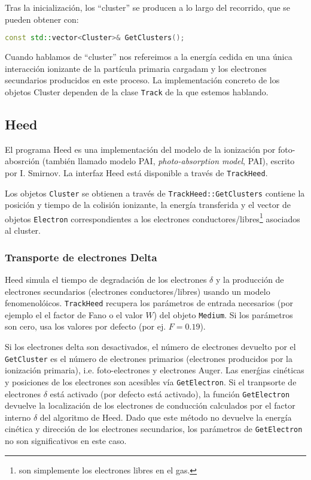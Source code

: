 Tras la inicialización, los ``cluster'' se producen a lo largo del recorrido, que se pueden obtener con: \\

\begin{lstlisting}[language=C++,style=c++]
const std::vector<Cluster>& GetClusters();
\end{lstlisting}
\vspace*{0.7em}
Cuando hablamos de ``cluster'' nos refereimos a la energía cedida en una única interacción ionizante de la partícula primaria cargadam y los electrones  secundarios producidos en este proceso. La implementación concreto de los objetos Cluster dependen de la clase \texttt{Track} de la que estemos hablando. 

\subsection{Heed}

El programa Heed es una implementación del modelo de la ionización por foto-abosrción (también llamado modelo PAI, \textit{photo-absorption model}, PAI), escrito por I. Smirnov. La interfaz Heed está disponible a través de \texttt{TrackHeed}.

Los objetos \texttt{Cluster} se obtienen a través de \texttt{TrackHeed::GetClusters} contiene la posición y tiempo de la colisión ionizante, la energía transferida y el vector de objetos \texttt{Electron} correspondientes a los electrones conductores/libres\footnote{son simplemente los electrones libres en el gas.} asociados al cluster. 

\subsubsection{Transporte de electrones Delta}

Heed simula el tiempo de degradación de los electrones $\delta$ y la producción de electrones secundarios (electrones conductores/libres) usando un modelo fenomenolóicos. \texttt{TrackHeed} recupera los parámetros de entrada necesarios (por ejemplo el el factor de Fano o el valor $W$) del objeto \texttt{Medium}. Si los parámetros son cero, usa los valores por defecto (por ej. $F=0.19$).


Si los electrones delta son desactivados, el número de electrones devuelto por el \texttt{GetCluster} es el número de electrones primarios (electrones producidos por la ionización primaria), i.e. foto-electrones y electrones Auger. Las enerǵias cinéticas y posiciones de los electrones son acesibles vía \texttt{GetElectron}. Si el tranpsorte de electrones $\delta$ está activado (por defecto está activado), la función \texttt{GetElectron} devuelve la localización de los electrones de conducción calculados por el factor interno $\delta$ del algoritmo de Heed. Dado que este método no devuelve la energía cinética y dirección de los electrones secundarios, los parámetros de \texttt{GetElectron} no son significativos en este caso.

